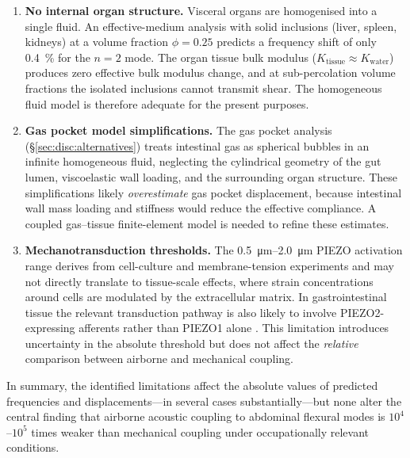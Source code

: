 \begin{enumerate}
  \item \textbf{No internal organ structure.}  Visceral organs are
    homogenised into a single fluid.  An effective-medium analysis with
    solid inclusions (liver, spleen, kidneys) at a volume fraction
    $\phi = 0.25$ predicts a frequency shift of only \SI{0.4}{\percent} for
    the $n=2$ mode.  The organ tissue bulk modulus
    ($K_\mathrm{tissue} \approx K_\mathrm{water}$) produces zero effective
    bulk modulus change, and at sub-percolation volume fractions the isolated
    inclusions cannot transmit shear.  The homogeneous fluid model is
    therefore adequate for the present purposes.

  \item \textbf{Gas pocket model simplifications.}  The gas pocket analysis
    (\S\ref{sec:disc:alternatives}) treats intestinal gas as spherical
    bubbles in an infinite homogeneous fluid, neglecting the cylindrical
    geometry of the gut lumen, viscoelastic wall loading, and the
    surrounding organ structure.  These simplifications likely
    \emph{overestimate} gas pocket displacement, because intestinal wall
    mass loading and stiffness would reduce the effective compliance.  A
    coupled gas--tissue finite-element model is needed to refine these
    estimates.

  \item \textbf{Mechanotransduction thresholds.}  The
    \SIrange{0.5}{2.0}{\micro\metre} PIEZO activation range
    \cite{coste2010piezo1,Lewis2015,Xiao2024} derives from cell-culture and
    membrane-tension experiments and may not directly translate to
    tissue-scale effects, where strain concentrations around cells are
    modulated by the extracellular matrix.  In gastrointestinal tissue the
    relevant transduction pathway is also likely to involve PIEZO2-expressing
    afferents rather than PIEZO1 alone \cite{ServinVences2023}.  This
    limitation introduces uncertainty in the absolute threshold but does not
    affect the \emph{relative} comparison between airborne and mechanical
    coupling.

\end{enumerate}

\noindent
In summary, the identified limitations affect the absolute values of
predicted frequencies and displacements---in several cases substantially---but
none alter the central finding that airborne acoustic coupling to abdominal
flexural modes is $10^4$--$10^5$ times weaker than mechanical coupling under
occupationally relevant conditions.

